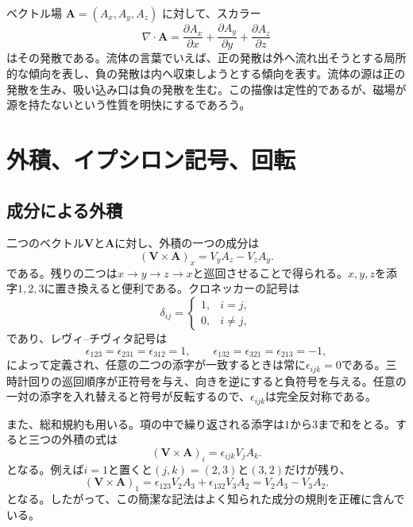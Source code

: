ベクトル場 \(\mathbf A=(A_x,A_y,A_z)\) に対して、スカラー
\begin{equation}
  \nabla\cdot\mathbf A
  =
  \frac{\partial A_x}{\partial x}
  +\frac{\partial A_y}{\partial y}
  +\frac{\partial A_z}{\partial z}
\end{equation}
はその発散である。流体の言葉でいえば、正の発散は外へ流れ出そうとする局所的な傾向を表し、負の発散は内へ収束しようとする傾向を表す。流体の源は正の発散を生み、吸い込み口は負の発散を生む。この描像は定性的であるが、磁場が源を持たないという性質を明快にするであろう。

\section{外積、イプシロン記号、回転}

\subsection{成分による外積}

二つのベクトル\(\mathbf V\)と\(\mathbf A\)に対し、外積の一つの成分は
\begin{equation}
  (\mathbf V\times\mathbf A)_x
  =
  V_yA_z-V_zA_y.
\end{equation}
である。残りの二つは\(x\to y\to z\to x\)と巡回させることで得られる。\(x,y,z\)を添字\(1,2,3\)に置き換えると便利である。クロネッカーの記号は
\begin{equation}
  \delta_{ij}
  =
  \begin{cases}
    1,&i=j,\\
    0,&i\ne j,
  \end{cases}
\end{equation}
であり、レヴィ--チヴィタ記号は
\begin{equation}
  \epsilon_{123}=\epsilon_{231}=\epsilon_{312}=1,
  \qquad
  \epsilon_{132}=\epsilon_{321}=\epsilon_{213}=-1,
\end{equation}
によって定義され、任意の二つの添字が一致するときは常に\(\epsilon_{ijk}=0\)である。三時計回りの巡回順序が正符号を与え、向きを逆にすると負符号を与える。任意の一対の添字を入れ替えると符号が反転するので、\(\epsilon_{ijk}\)は完全反対称である。

また、総和規約も用いる。項の中で繰り返される添字は\(1\)から\(3\)まで和をとる。すると三つの外積の式は
\begin{equation}
  (\mathbf V\times\mathbf A)_i
  =
  \epsilon_{ijk}V_jA_k.
\end{equation}
となる。例えば\(i=1\)と置くと\((j,k)=(2,3)\)と\((3,2)\)だけが残り、
\begin{equation}
  (\mathbf V\times\mathbf A)_1
  =
  \epsilon_{123}V_2A_3
  +\epsilon_{132}V_3A_2
  =
  V_2A_3-V_3A_2.
\end{equation}
となる。したがって、この簡潔な記法はよく知られた成分の規則を正確に含んでいる。

